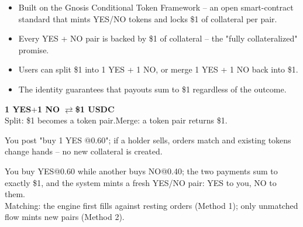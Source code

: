 \begin{frame}[t]
\par{}
\begin{pmbody}
\begin{itemize}\pmspreaditems
  \item Built on the Gnosis Conditional Token Framework -- an open smart-contract standard that mints YES/NO tokens and locks \$1 of collateral per pair.
  \item Every YES + NO pair is backed by \$1 of collateral -- the "fully collateralized" promise.
  \item Users can split \$1 into 1 YES + 1 NO, or merge 1 YES + 1 NO back into \$1.
  \item The identity guarantees that payouts sum to \$1 regardless of the outcome.
\end{itemize}
\begin{pmcallout}
\centering
\textcolor{pmGreen}{\textbf{1 YES}}\quad +\quad \textcolor{pmRed}{\textbf{1 NO}}
\qquad $\rightleftarrows$\qquad \textbf{\$1 USDC}\\[9pt]
{\color{pmGrey}\fontsize{15}{21}\selectfont Split: \$1 becomes a token pair.\qquad Merge: a token pair returns \$1.}
\end{pmcallout}
\end{pmbody}
\end{frame}

\begin{frame}[t]
\par{}
\begin{pmbody}
\begin{pmcallout}
  You post "buy 1 YES @0.60"; if a holder sells, orders match and existing tokens change hands -- no new collateral is created.
\end{pmcallout}
\begin{pmcallout}
  You buy YES@0.60 while another buys NO@0.40; the two payments sum to exactly \$1, and the system mints a fresh YES/NO pair: YES to you, NO to them. \\
  Matching: the engine first fills against resting orders (Method 1); only unmatched flow mints new pairs (Method 2).
\end{pmcallout}
\end{pmbody}
\end{frame}

